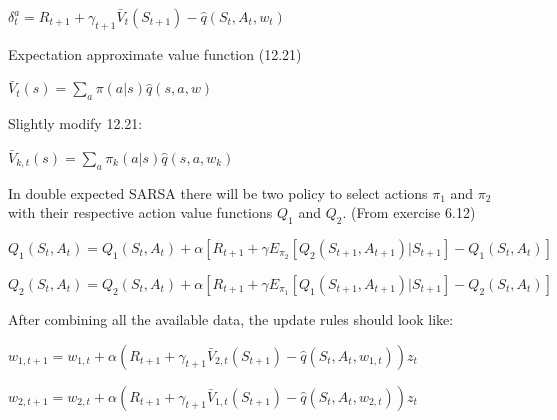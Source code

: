 \documentclass[11pt]{article}
\begin{document}
    \noindent $ \delta_{t}^{a} = R_{t+1} + \gamma_{t+1} \bar{V}_{t}(S_{t+1}) - \hat{q}(S_t,A_t,w_t) $


    \hfill \break
    \noindent Expectation approximate value function (12.21)

    \noindent $ \bar{V}_{t}(s) = \sum_{a} \pi(a|s)\hat{q}(s,a,w)  $


    \hfill \break
    \noindent Slightly modify 12.21:

    \noindent $ \bar{V}_{k, t}(s) = \sum_{a} \pi_{k}(a|s)\hat{q}(s,a,w_{k})  $

    \hfill \break
    \noindent In double expected SARSA there will be two policy to select actions $\pi_1$ and $\pi_2$  with their respective action value functions $Q_1$ and $Q_2$. (From exercise 6.12)

    \noindent $ Q_1(S_t, A_t) =  Q_1(S_t, A_t) + \alpha [ R_{t+1} + \gamma E_{\pi_2} [ Q_2(S_{t+1}, A_{t+1}) | S_{t+1}] - Q_1(S_t, A_t) ] $

    \noindent $ Q_2(S_t, A_t) =  Q_2(S_t, A_t) + \alpha [ R_{t+1} + \gamma E_{\pi_1} [ Q_1(S_{t+1}, A_{t+1}) | S_{t+1}] - Q_2(S_t, A_t) ] $

    \hfill \break
    \noindent After combining all the available data, the update rules should look like:

    \noindent $ w_{1, t+1} = w_{1, t} + \alpha (R_{t+1} + \gamma_{t+1} \bar{V}_{2, t}(S_{t+1}) - \hat{q}(S_t,A_t,w_{1,t}))  z_{t} $

    \noindent $ w_{2, t+1} = w_{2, t} + \alpha (R_{t+1} + \gamma_{t+1} \bar{V}_{1, t}(S_{t+1}) - \hat{q}(S_t,A_t,w_{2,t}))  z_{t} $
\end{document}
